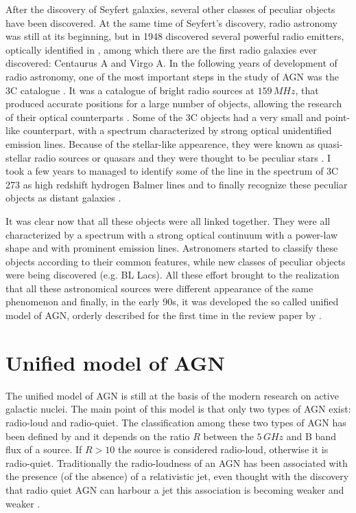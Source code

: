 \documentclass[../thesis.tex]{subfiles}
\begin{document}
After the discovery of Seyfert galaxies, several other classes of peculiar objects have been discovered. 
At the same time of Seyfert's discovery, radio astronomy was still at its beginning, but in 1948 \citet{Bolton48} discovered several powerful radio emitters, optically identified in \citet{Bolton49}, among which there are the first radio galaxies ever discovered: Centaurus A and Virgo A.
In the following years of development of radio astronomy, one of the most important steps in the study of AGN was the 3C catalogue \citep{Edge59}.
It was a catalogue of bright radio sources at $159\,\si{MHz}$, that produced accurate positions for a large number of objects, allowing the research of their optical counterparts \citep{Shields99}.
Some of the 3C objects had a very small and point-like counterpart, with a spectrum characterized by strong optical unidentified emission lines.
Because of the stellar-like appearence, they were known as quasi-stellar radio sources or quasars and they were thought to be peculiar stars \citep{Shields99}.
I took a few years to managed to identify some of the line in the spectrum of 3C 273 as high redshift hydrogen Balmer lines and to finally recognize these peculiar objects as distant galaxies \citep{Schmidt63}.

It was clear now that all these objects were all linked together.
They were all characterized by a spectrum with a strong optical continuum with a power-law shape and with prominent emission lines.
Astronomers started to classify these objects according to their common features, while new classes of peculiar objects were being discovered (e.g. BL Lacs).
All these effort brought to the realization that all these astronomical sources were different appearance of the same phenomenon and finally, in the early 90s, it was developed the so called unified model of AGN, orderly described for the first time in the review paper by \citet{Antonucci93}.


\section{Unified model of AGN}
\label{sec:unified_model}

The unified model of AGN \citep{Antonucci93} is still at the basis of the modern research on active galactic nuclei.
The main point of this model is that only two types of AGN exist: radio-loud and radio-quiet.
The classification among these two types of AGN has been defined by \citet{Kellermann89} and it depends on the ratio $R$ between the $5\,\si{GHz}$ and B band flux of a source.
If $R>10$ the source is considered radio-loud, otherwise it is radio-quiet.
Traditionally the radio-loudness of an AGN has been associated with the presence (of the absence) of a relativistic jet, even thought with the discovery that radio quiet AGN can harbour a jet \citep[e.g.][]{Blundell03} this association is becoming weaker and weaker \citep{Padovani17,Foschini17}.
\end{document}
